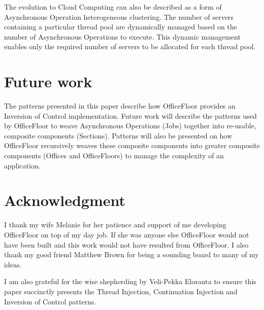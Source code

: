 \documentclass[prodmode]{style/acmlarge}
\begin{document}
The evolution to Cloud Computing can also be described as a form of Asynchronous
Operation heterogeneous clustering.  The number of servers containing a
particular thread pool are dynamically managed based on the number of
Asynchronous Operations to execute.  This dynamic management enables only the
required number of servers to be allocated for each thread pool.



\section{Future work}

The patterns presented in this paper describe how OfficeFloor \cite{officefloor}
provides an Inversion of Control implementation.  Future work will describe the
patterns used by OfficeFloor to weave Asynchronous Operations (Jobs) together
into re-usable, composite components (Sections).  Patterns will also be
presented on how OfficeFloor recursively weaves these composite components into
greater composite components (Offices and OfficeFloors) to manage the complexity
of an application.



\section*{Acknowledgment} I thank my wife Melanie for her patience and support
of me developing OfficeFloor on top of my day job.  If she was anyone else
OfficeFloor would not have been built and this work would not have resulted from
OfficeFloor.  I also thank my good friend Matthew Brown for being a sounding
board to many of my ideas.

I am also grateful for the wise shepherding by Veli-Pekka Eloranta to ensure
this paper succinctly presents the Thread Injection, Continuation Injection and
Inversion of Control patterns.




\end{document}
